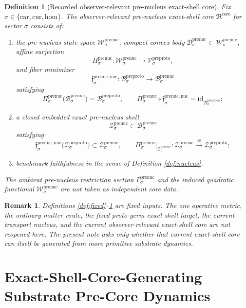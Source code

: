 \documentclass[11pt]{article}
\newcommand{\Car}{\mathrm{car}}
\newcommand{\Cur}{\mathrm{cur}}
\newcommand{\Hom}{\mathrm{hom}}
\newcommand{\PreProtoSpace}[1]{\mathcal V_{#1}^{\mathrm{preproto}}}
\newcommand{\PreProtoBody}[1]{\mathcal B_{#1}^{\mathrm{preproto}}}
\newcommand{\PreProtoShellSet}[1]{\mathcal Z_{#1}^{\mathrm{preproto}}}
\newcommand{\PreNucCore}{\mathfrak R^{\mathrm{core}}}
\newcommand{\PreNucSpace}[1]{\mathcal W_{#1}^{\mathrm{prenuc}}}
\newcommand{\PreNucBody}[1]{\mathcal B_{#1}^{\mathrm{prenuc}}}
\newcommand{\PreNucProj}[1]{\Pi_{#1}^{\mathrm{prenuc}}}
\newcommand{\PreNucNucleusMin}[1]{\mathfrak f_{#1}^{\mathrm{prenuc,nuc}}}
\newcommand{\PreNucSection}[1]{\Gamma_{#1}^{\mathrm{prenuc}}}
\newcommand{\PreNucFunctional}[1]{\mathscr W_{#1}^{\mathrm{prenuc}}}
\newcommand{\PreNucShellSet}[1]{\mathcal Z_{#1}^{\mathrm{prenuc}}}
\newtheorem{definition}{Definition}
\newtheorem{remark}{Remark}
\begin{document}
\begin{definition}[Recorded observer-relevant pre-nucleus exact-shell core]
\label{def:core}
Fix \(\sigma\in\{\Car,\Cur,\Hom\}\). The \emph{observer-relevant pre-nucleus exact-shell core} \(\PreNucCore\) for sector \(\sigma\) consists of:
\begin{enumerate}
    \item the pre-nucleus state space \(\PreNucSpace{\sigma}\), compact convex body \(\PreNucBody{\sigma}\subset\PreNucSpace{\sigma}\), affine surjection
    \[
    \PreNucProj{\sigma}:\PreNucSpace{\sigma}\to\PreProtoSpace{\sigma},
    \]
    and fiber minimizer
    \[
    \PreNucNucleusMin{\sigma}:\PreProtoBody{\sigma}\to\PreNucBody{\sigma}
    \]
    satisfying
    \[
    \PreNucProj{\sigma}\bigl(\PreNucBody{\sigma}\bigr)=\PreProtoBody{\sigma},
    \qquad
    \PreNucProj{\sigma}\circ\PreNucNucleusMin{\sigma}
    =
    \mathrm{id}_{\PreProtoBody{\sigma}};
    \]
    \item a closed embedded exact pre-nucleus shell
    \[
    \PreNucShellSet{\sigma}\subset\PreNucBody{\sigma}
    \]
    satisfying
    \[
    \PreNucNucleusMin{\sigma}\bigl(\PreProtoShellSet{\sigma}\bigr)
    \subset
    \PreNucShellSet{\sigma},
    \qquad
    \PreNucProj{\sigma}\big|_{\PreNucShellSet{\sigma}}
    :
    \PreNucShellSet{\sigma}
    \xrightarrow{\cong}
    \PreProtoShellSet{\sigma};
    \]
    \item benchmark faithfulness in the sense of Definition \ref{def:nucleus}.
\end{enumerate}
The ambient pre-nucleus restriction section \(\PreNucSection{\sigma}\) and the induced quadratic functional \(\PreNucFunctional{\sigma}\) are not taken as independent core data.
\end{definition}

\begin{remark}
Definitions \ref{def:fixed}--\ref{def:core} are fixed inputs. The one operative metric, the ordinary matter route, the fixed proto-germ exact-shell target, the current transport nucleus, and the current observer-relevant exact-shell core are not reopened here. The present note asks only whether that current exact-shell core can itself be generated from more primitive substrate dynamics.
\end{remark}

\section{Exact-Shell-Core-Generating Substrate Pre-Core Dynamics}
\end{document}
